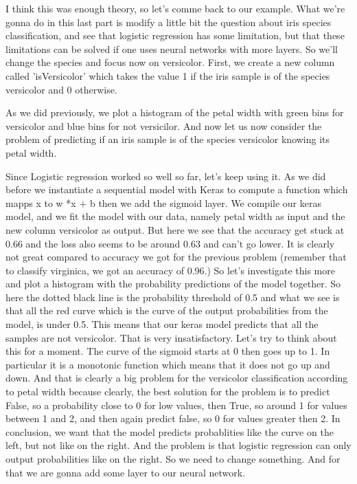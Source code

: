 \documentclass{article}
\begin{document}
I think this was enough theory, so let's comme back to our example.
What we're gonna do in this last part is modify a little bit the question about iris 
species classification, and see that 
logistic regression has some limitation, but that these limitations 
can be solved if one uses neural networks with more layers.
So we'll change the species and focus now on versicolor.
First, we create a new column called 'isVersicolor' which takes the value 1 if the iris sample is of the species versicolor and 
0 otherwise.

As we did previously, we plot a histogram of the petal width with green bins for versicolor and blue bins for 
not versicilor.
And now let us now consider the problem of predicting if an iris sample 
is of the species versicolor knowing its petal width.

Since Logistic regression worked so well so far, let's keep using it.
As we did before we instantiate a sequential model with Keras to compute a function 
which mapps x to w *x + b
then we add the sigmoid layer.
We compile our keras model, and we fit the model with our data, namely 
petal width as input and the new column versicolor as output.
But here we see that the accuracy get stuck at 0.66 and the loss also seems to be around 
0.63 and can't go lower.
It is clearly not great compared to accuracy we got for the previous problem 
(remember that to classify virginica, we got an accuracy of 0.96.)
So let's investigate this more and plot a histogram with the probability predictions 
of the model together.
So here the dotted black line is the probability threshold of 0.5 and what we see is that 
all the red curve which is the curve of the output probabilities from the model,
is under 0.5.
This means that our keras model predicts that all the samples are not versicolor. 
That is very insatisfactory. 
Let's try to think about this for a moment. 
The curve of the sigmoid starts at 0 then goes up to 1.
In particular it is a monotonic function which means that it does not go up and down. 
And that is clearly a big problem for the versicolor classification according 
to petal width because clearly, the best solution for the problem 
is to predict False, so a probability close to 0 for low values, 
then True, so around 1 for values between 1 and 2, and then again predict false, so 0 
for values greater then 2. 
In conclusion, we want that the model predicts probablities like the curve on the left, 
but not like on the right.
And the problem is that logistic regression can only output probabilities like on the right.
So we need to change something.
And for that we are gonna add some layer to our neural network.
\end{document}
